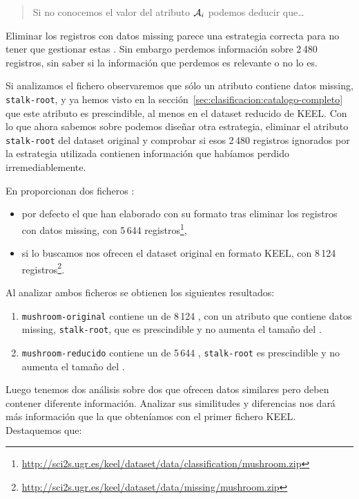 \begin{quote}
Si no conocemos el valor del atributo $\A_i$ podemos deducir que\ldots
\end{quote}

Eliminar los registros con datos missing parece una estrategia correcta para no tener que gestionar estas \ars. Sin embargo perdemos información sobre 2\,480 registros, sin saber si la información que perdemos es relevante o no lo es.

Si analizamos el fichero \mushroom observaremos que sólo un atributo contiene datos missing, \texttt{stalk-root}, y ya hemos visto en la sección~\ref{sec:clasificacion:catalogo-completo} que este atributo es prescindible, al menos en el dataset reducido de KEEL. Con lo que ahora sabemos sobre \catalogos podemos diseñar otra estrategia, eliminar el atributo \texttt{stalk-root} del dataset original y comprobar si esos 2\,480 registros ignorados por la estrategia utilizada contienen información que habíamos perdido irremediablemente.

En  proporcionan dos ficheros \mushroom:
\begin{itemize}
  \item por defecto el que han elaborado con su formato tras eliminar los registros con datos missing, con 5\,644 registros\footnote{\scriptsize\url{http://sci2s.ugr.es/keel/dataset/data/classification/mushroom.zip}},
  \item si lo buscamos nos ofrecen el dataset original en formato KEEL, con 8\,124 registros\footnote{\scriptsize\url{http://sci2s.ugr.es/keel/dataset/data/missing/mushroom.zip}}.
\end{itemize}
Al analizar ambos ficheros se obtienen los siguientes resultados:
\begin{enumerate}
  \item \texttt{mushroom-original} contiene un \sCC de 8\,124 \registros, con un atributo que contiene datos missing, \texttt{stalk-root}, que es prescindible y no aumenta el tamaño del \catalogo.
  \item \texttt{mushroom-reducido} contiene un \sCC de 5\,644 \registros, \texttt{stalk-root} es prescindible y no aumenta el tamaño del \catalogo.
\end{enumerate}
Luego tenemos dos análisis sobre dos \datasets que ofrecen datos similares pero deben contener diferente información. Analizar sus similitudes y diferencias nos dará más información que la que obteníamos con el primer fichero KEEL. Destaquemos que:

